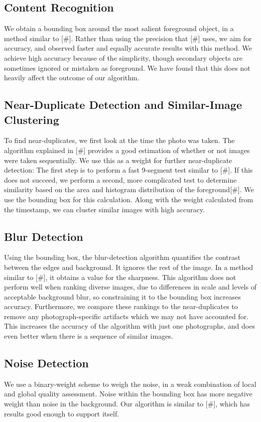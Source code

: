 \documentclass[twocolumn]{article}
\begin{document}
\subsection{Content Recognition}
We obtain a bounding box around the most salient foreground object, in a method similar to [\#]. Rather than using the precision that [\#] uses, we aim for accuracy, and observed faster and equally accurate results with this method. We achieve high accuracy because of the simplicity, though secondary objects are sometimes ignored or mistaken as foreground. We have found that this does not heavily affect the outcome of our algorithm.
\subsection{Near-Duplicate Detection and Similar-Image Clustering}
To find near-duplicates, we first look at the time the photo was taken. The algorithm explained in [\#] provides a good estimation of whether or not images were taken sequentially. We use this as a weight for further near-duplicate detection:
The first step is to perform a fast 9-segment test similar to [\#]. If this does not succeed, we perform a second, more complicated test to determine similarity based on the area and histogram distribution of the foreground[\#]. We use the bounding box for this calculation.
Along with the weight calculated from the timestamp, we can cluster similar images with high accuracy.
\subsection{Blur Detection}
Using the bounding box, the blur-detection algorithm quantifies the contrast between the edges and background. It ignores the rest of the image. In a method similar to [\#], it obtains a value for the sharpness. This algorithm does not perform well when ranking diverse images, due to differences in scale and levels of acceptable background blur, so constraining it to the bounding box increases accuracy. Furthermore, we compare these rankings to the near-duplicates to remove any photograph-specific artifacts which we may not have accounted for. This increases the accuracy of the algorithm with just one photographs, and does even better when there is a sequence of similar images.
\subsection{Noise Detection}
We use a binary-weight scheme to weigh the noise, in a weak combination of local and global quality assessment. Noise within the bounding box has more negative weight than noise in the background. Our algorithm is similar to [\#], which has results good enough to support itself.
\end{document}

